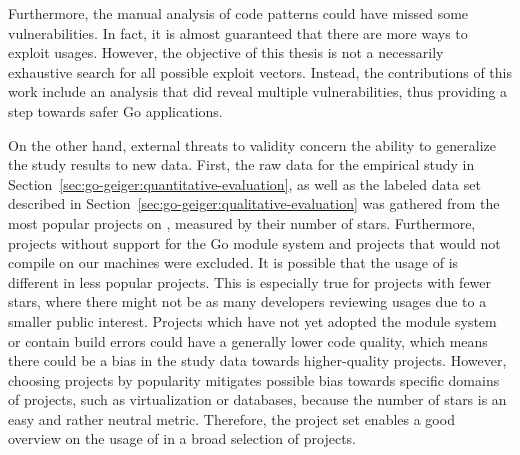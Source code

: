 Furthermore, the manual analysis of \unsafe{} code patterns could have missed some vulnerabilities.
In fact, it is almost guaranteed that there are more ways to exploit \unsafe{} usages.
However, the objective of this thesis is not a necessarily exhaustive search for all possible exploit vectors.
Instead, the contributions of this work include an analysis that did reveal multiple vulnerabilities, thus providing a
step towards safer Go applications.

On the other hand, external threats to validity concern the ability to generalize the study results to new data.
First, the raw data for the empirical study in Section~\ref{sec:go-geiger:quantitative-evaluation}, as well as the
labeled data set described in Section~\ref{sec:go-geiger:qualitative-evaluation} was gathered from the most popular
projects on \github{}, measured by their number of stars.
Furthermore, projects without support for the Go module system and projects that would not compile on our machines were
excluded.
It is possible that the usage of \unsafe{} is different in less popular projects.
This is especially true for projects with fewer stars, where there might not be as many developers reviewing \unsafe{}
usages due to a smaller public interest.
Projects which have not yet adopted the module system or contain build errors could have a generally lower code quality,
which means there could be a bias in the study data towards higher-quality projects.
However, choosing projects by popularity mitigates possible bias towards specific domains of projects, such as
virtualization or databases, because the number of stars is an easy and rather neutral metric.
Therefore, the project set enables a good overview on the usage of \unsafe{} in a broad selection of projects.
